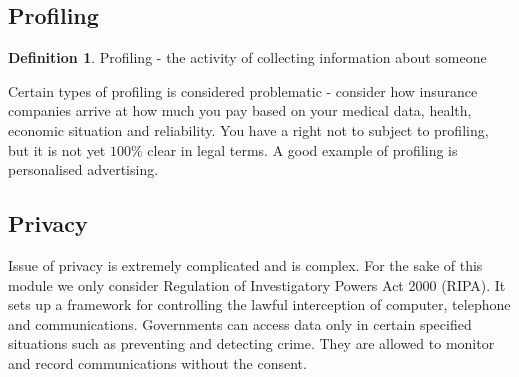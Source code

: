 \documentclass[a4paper]{article}
\theoremstyle{plain}
\theoremstyle{definition}
\newtheorem{defn}{Definition}[section]
\theoremstyle{remark}
\begin{document}
\subsection{Profiling}
\begin{defn}
	Profiling - the activity of collecting information about someone
\end{defn}
Certain types of profiling is considered problematic - consider how insurance companies arrive at how much you pay based on your medical data, health, economic situation and reliability. You have a right not to subject to profiling, but it is not yet $100\%$ clear in legal terms. A good example of profiling is personalised advertising.
\subsection{Privacy}
Issue of privacy is extremely complicated and is complex. For the sake of this module we only consider Regulation of Investigatory Powers Act 2000 (RIPA). It sets up a framework for controlling the lawful interception of computer, telephone and communications. Governments can access data only in certain specified situations such as preventing and detecting crime. They are allowed to monitor and record communications without the consent.
\end{document}
